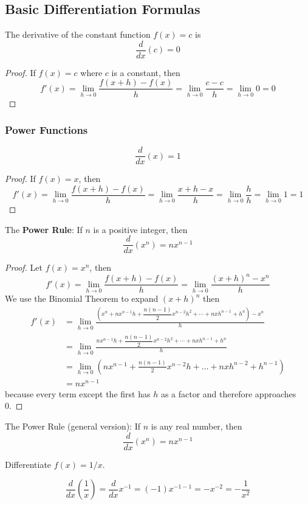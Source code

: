 \subsection{Basic Differentiation Formulas}

The derivative of the constant function \(f(x)=c\) is
\[\frac{d}{dx}(c)=0\]
\begin{proof}
    If \(f(x)=c\) where \(c\) is a constant, then
    \[f'(x)=\lim_{h\to 0}\frac{f(x+h)-f(x)}{h}
    =\lim_{h\to 0}\frac{c-c}{h}=\lim_{h\to 0}0=0\]
\end{proof}

\subsubsection*{Power Functions}
\[\frac{d}{dx}(x)=1\]
\begin{proof}
    If \(f(x)=x\), then
    \[f'(x)=\lim_{h\to 0}\frac{f(x+h)-f(x)}{h}=\lim_{h\to 0}\frac{x+h-x}{h}
    =\lim_{h\to 0}\frac{h}{h}=\lim_{h\to 0}1=1\]
\end{proof}
The \textbf{Power Rule}:
If \(n\) is a positive integer, then
\[\frac{d}{dx}(x^n)=nx^{n-1}\]
\begin{proof}
    Let \(f(x)=x^n\), then
    \[f'(x)=\lim_{h\to 0}\frac{f(x+h)-f(x)}{h}
    =\lim_{h\to 0}\frac{(x+h)^n-x^n}{h}\]
    We use the Binomial Theorem to expand \((x+h)^n\) then
    \begin{align*}
        f'(x)
        &= \lim_{h\to 0}
        \frac{
            \left(x^n+nx^{n-1}h+\dfrac{n(n-1)}{2}x^{n-2}h^2+\cdots+nxh^{n-1}
            +h^n\right)-x^n}{h} \\
        &= \lim_{h\to 0}
        \frac{
            nx^{n-1}h+\dfrac{n(n-1)}{2}x^{n-2}h^2+\cdots+nxh^{n-1}+h^n}{h} \\
        &= \lim_{h\to 0}
        (nx^{n-1}+\frac{n(n-1)}{2}x^{n-2}h+\dots+nxh^{n-2}+h^{n-1}) \\
        &= nx^{n-1}
    \end{align*}
    because every term except the first has \(h\) as a factor and therefore
    approaches 0.
\end{proof}
The Power Rule (general version):
If \(n\) is any real number, then
\[\frac{d}{dx}(x^n)=nx^{n-1}\]
\begin{problem}
    Differentiate \(f(x)=1/x\).
\end{problem}
\begin{solution}
    \[\frac{d}{dx}\left(\frac{1}{x}\right)=\frac{d}{dx}x^{-1}=(-1)x^{-1-1}
    =-x^{-2}=-\frac{1}{x^2}\]
\end{solution}
